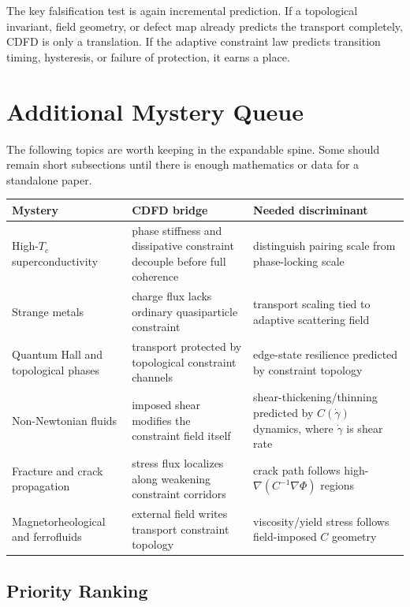 \documentclass[11pt]{article}
\begin{document}
The key falsification test is again incremental prediction. If a topological invariant, field geometry, or defect map already predicts the transport completely, CDFD is only a translation. If the adaptive constraint law predicts transition timing, hysteresis, or failure of protection, it earns a place.

\section{Additional Mystery Queue}

The following topics are worth keeping in the expandable spine. Some should remain short subsections until there is enough mathematics or data for a standalone paper.

\begin{center}
\begin{tabular}{L{0.22\textwidth}L{0.34\textwidth}L{0.30\textwidth}}
\toprule
\textbf{Mystery} & \textbf{CDFD bridge} & \textbf{Needed discriminant}\\
\midrule
High-$T_c$ superconductivity & phase stiffness and dissipative constraint decouple before full coherence & distinguish pairing scale from phase-locking scale\\
Strange metals & charge flux lacks ordinary quasiparticle constraint & transport scaling tied to adaptive scattering field\\
Quantum Hall and topological phases & transport protected by topological constraint channels & edge-state resilience predicted by constraint topology\\
Non-Newtonian fluids & imposed shear modifies the constraint field itself & shear-thickening/thinning predicted by $C(\dot{\gamma})$ dynamics, where $\dot{\gamma}$ is shear rate\\
Fracture and crack propagation & stress flux localizes along weakening constraint corridors & crack path follows high-$\nabla(C^{-1}\nabla\Phi)$ regions\\
Magnetorheological and ferrofluids & external field writes transport constraint topology & viscosity/yield stress follows field-imposed $C$ geometry\\
\bottomrule
\end{tabular}
\end{center}

\subsection{Priority Ranking}
\end{document}
